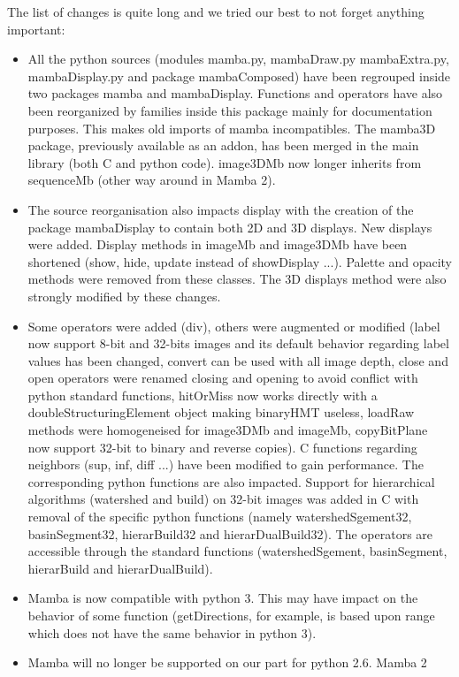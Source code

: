 \documentclass[a4paper,10pt,oneside]{article}
\begin{document}
The list of changes is quite long and we tried our best to not forget
anything important:
\begin{itemize}
\item All the python sources (modules mamba.py, mambaDraw.py mambaExtra.py,
mambaDisplay.py and package mambaComposed) have been regrouped inside two packages
mamba and mambaDisplay. Functions and operators have also been reorganized
by families inside this package mainly for documentation purposes. This makes old
imports of mamba incompatibles. The mamba3D package, previously available as an
addon, has been merged in the main library (both C and python code). image3DMb 
now longer inherits from sequenceMb (other way around in Mamba 2).
\item The source reorganisation also impacts display with the creation of
the package mambaDisplay to contain both 2D and 3D displays. New displays were
added. Display methods in imageMb and image3DMb have been shortened (show,
hide, update instead of showDisplay ...). Palette and opacity methods were
removed from these classes. The 3D displays method were also strongly
modified by these changes.
\item Some operators were added (div), others were augmented or modified 
(label now support 8-bit and 32-bits images and its default behavior regarding
label values has been changed, convert can be used with all image depth, close
and open operators were renamed closing and opening to avoid conflict with
python standard functions, hitOrMiss now works directly with a
doubleStructuringElement object making binaryHMT useless, loadRaw methods were
homogeneised for image3DMb and imageMb, copyBitPlane now support 32-bit to
binary and reverse copies). C functions regarding neighbors (sup, inf, diff ...)
have been modified to gain performance. The corresponding python functions are
also impacted. Support for hierarchical algorithms (watershed and build) on
32-bit images was added in C with removal of the specific python functions
(namely watershedSgement32, basinSegment32, hierarBuild32 and hierarDualBuild32).
The operators are accessible through the standard functions (watershedSgement,
basinSegment, hierarBuild and hierarDualBuild).
\item Mamba is now compatible with python 3. This may have impact on the
behavior of some function (getDirections, for example, is based upon range
which does not have the same behavior in python 3).
\item Mamba will no longer be supported on our part for python 2.6. Mamba 2

\end{itemize}
\end{document}
